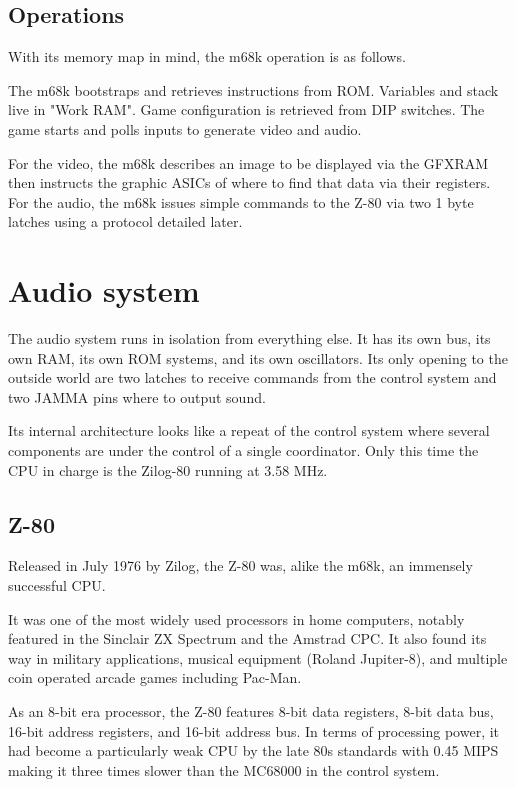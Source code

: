 \subsection{Operations}
With its memory map in mind, the m68k operation is as follows.

The m68k bootstraps and retrieves instructions from ROM. Variables and stack live in "Work RAM". Game configuration is retrieved from DIP switches. The game starts and polls inputs to generate video and audio. 

For the video, the m68k describes an image to be displayed via the GFXRAM then instructs the graphic ASICs of where to find that data via their registers. For the audio, the m68k issues simple commands to the Z-80 via two 1 byte latches using a protocol detailed later.
  











\pagebreak
\section{Audio system}
The audio system runs in isolation from everything else. It has its own bus, its own RAM, its own ROM systems, and its own oscillators. Its only opening to the outside world are two latches to receive commands from the control system and two JAMMA pins where to output sound.

Its internal architecture looks like a repeat of the control system where several components are under the control of a single coordinator. Only this time the CPU in charge is the Zilog-80 running at 3.58 MHz.

\subsection{Z-80}
Released in July 1976 by Zilog, the Z-80 was, alike the m68k, an immensely successful CPU. 

It was one of the most widely used processors in home computers, notably featured in the Sinclair ZX Spectrum and the Amstrad CPC. It also found its way in military applications, musical equipment (Roland Jupiter-8), and multiple coin operated arcade games including Pac-Man. 

As an 8-bit era processor, the Z-80 features 8-bit data registers, 8-bit data bus, 16-bit address registers, and 16-bit address bus. In terms of processing power, it had become a particularly weak CPU by the late 80s standards with 0.45 MIPS making it three times slower than the MC68000 in the control system. 


